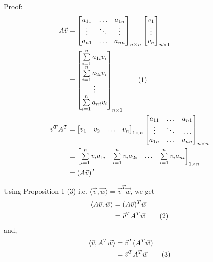 \documentclass[12pt,a4paper]{article}
\newcommand\numberthis{\addtocounter{equation}{1}\tag{\theequation}}
\begin{document}
    Proof:
    \begin{align*}
        A\vec{v} &= 
        \begin{bmatrix}
            a_{11} & \hdots & a_{1n} \\
            \vdots & \ddots & \vdots \\
            a_{n1} & \hdots & a_{nn} \\
        \end{bmatrix}_{n \times n}
        \begin{bmatrix}
            v_1 \\
            \vdots \\
            v_n \\
        \end{bmatrix}_{n \times 1}
        \\
        &= 
        \begin{bmatrix}
            \sum\limits_{i=1}^n a_{1i}v_i \\
            \sum\limits_{i=1}^n a_{2i}v_i \\
            \vdots \\
            \sum\limits_{i=1}^n a_{ni}v_i \\
        \end{bmatrix}_{n \times 1} \numberthis
        \\
        \vec{v}^TA^T &= 
        \begin{bmatrix}
            v_1 & v_2 & \hdots & v_n
        \end{bmatrix}_{1 \times n}
        \begin{bmatrix}
            a_{11} & \hdots & a_{n1} \\
            \vdots & \ddots & \hdots \\
            a_{1n} & \hdots & a_{nn} \\
        \end{bmatrix}_{n \times n}
        \\
        &= \begin{bmatrix}
            \sum\limits_{i=1}^n v_ia_{1i} & \sum\limits_{i=1}^n v_ia_{2i} & \hdots & \sum\limits_{i=1}^n v_ia_{ni}
        \end{bmatrix}_{1 \times n} \\
        &= (A\vec{v})^T
    \end{align*}
    
    Using Proposition 1 (3) i.e. $\langle \vec{v}, \vec{w} \rangle = \vec{v}^T\vec{w}$, we get
    \begin{align*}
        \langle A\vec{v}, \vec{w} \rangle &= (A\vec{v})^T\vec{w} \\
                                          &= \vec{v}^TA^T\vec{w} \label{eq:6} \numberthis
    \end{align*}
    and,
    \begin{align*}
        \langle \vec{v}, A^T\vec{w} \rangle &= \vec{v}^T(A^T\vec{w}) \\
                                          &= \vec{v}^TA^T\vec{w} \label{eq:7} \numberthis
    \end{align*}
    
\end{document}
